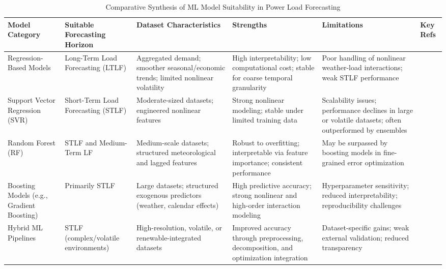 \documentclass[conference]{IEEEtran}
\begin{document}
\begin{table}[htpb]
\caption{Comparative Synthesis of ML Model Suitability in Power Load Forecasting}
\label{tab:model_synthesis}
\centering
\renewcommand{\arraystretch}{1.2}
\begin{tabular}{|p{2.5cm}|p{2.2cm}|p{3.2cm}|p{3cm}|p{3cm}|p{1.5cm}|}
\hline
\textbf{Model Category} &
\textbf{Suitable Forecasting Horizon} &
\textbf{Dataset Characteristics} &
\textbf{Strengths} &
\textbf{Limitations} &
\textbf{Key Refs} \\
\hline

Regression-Based Models &
Long-Term Load Forecasting (LTLF) &
Aggregated demand; smoother seasonal/economic trends; limited nonlinear volatility &
High interpretability; low computational cost; stable for coarse temporal granularity &
Poor handling of nonlinear weather-load interactions; weak STLF performance &
\cite{zhang2021,wazirali2023} \\
\hline

Support Vector Regression (SVR) &
Short-Term Load Forecasting (STLF) &
Moderate-sized datasets; engineered nonlinear features &
Strong nonlinear modeling; stable under limited training data &
Scalability issues; performance declines in large or volatile datasets; often outperformed by ensembles &
\cite{azeem2021,zhang2021} \\
\hline

Random Forest (RF) &
STLF and Medium-Term LF &
Medium-scale datasets; structured meteorological and lagged features &
Robust to overfitting; interpretable via feature importance; consistent performance &
May be surpassed by boosting models in fine-grained error optimization &
\cite{vivas2020,zhang2021} \\
\hline

Boosting Models (e.g., Gradient Boosting) &
Primarily STLF &
Large datasets; structured exogenous predictors (weather, calendar effects) &
High predictive accuracy; strong nonlinear and high-order interaction modeling &
Hyperparameter sensitivity; reduced interpretability; reproducibility challenges &
\cite{habbak2023,wazirali2023} \\
\hline

Hybrid ML Pipelines &
STLF (complex/volatile environments) &
High-resolution, volatile, or renewable-integrated datasets &
Improved accuracy through preprocessing, decomposition, and optimization integration &
Dataset-specific gains; weak external validation; reduced transparency &
\cite{vivas2020,azeem2021} \\
\hline

\end{tabular}
\end{table}
\end{document}
